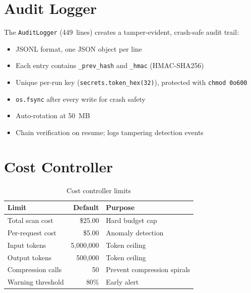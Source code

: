 \documentclass[12pt,a4paper]{report}
\begin{document}
\section{Audit Logger}
The \texttt{AuditLogger} (449~lines) creates a tamper-evident, crash-safe audit trail:
\begin{itemize}[noitemsep]
  \item JSONL format, one JSON object per line
  \item Each entry contains \texttt{\_prev\_hash} and \texttt{\_hmac} (HMAC-SHA256)
  \item Unique per-run key (\texttt{secrets.token\_hex(32)}), protected with \texttt{chmod 0o600}
  \item \texttt{os.fsync} after every write for crash safety
  \item Auto-rotation at 50~MB
  \item Chain verification on resume; logs tampering detection events
\end{itemize}

\section{Cost Controller}
\begin{table}[H]
\centering
\caption{Cost controller limits}
\label{tab:cost}
\begin{tabular}{lrl}
\toprule
\textbf{Limit} & \textbf{Default} & \textbf{Purpose} \\
\midrule
Total scan cost      & \$25.00    & Hard budget cap \\
Per-request cost     & \$5.00     & Anomaly detection \\
Input tokens         & 5,000,000  & Token ceiling \\
Output tokens        & 500,000    & Token ceiling \\
Compression calls    & 50         & Prevent compression spirals \\
Warning threshold    & 80\%       & Early alert \\
\bottomrule
\end{tabular}
\end{table}
\end{document}
